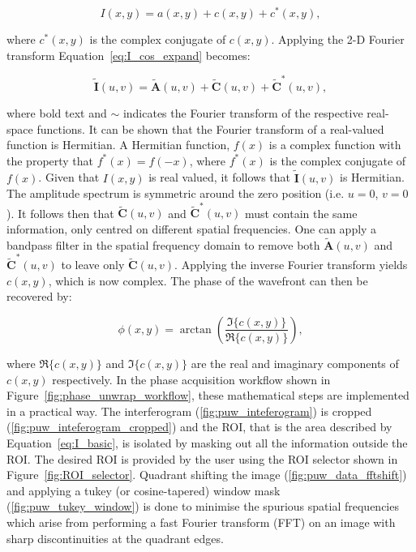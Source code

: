 \begin{equation}\label{eq:I_cos_expand}
I(x,y) = a(x,y) + c(x,y) + c^{*}(x,y),
\end{equation}

where $c^{*}(x,y)$ is the complex conjugate of $c(x,y)$. Applying the 2-D Fourier transform Equation~\ref{eq:I_cos_expand} becomes:

\begin{equation}\label{eq:I_fourier}
\tilde{\boldsymbol{I}}(u,v) = \tilde{\boldsymbol{A}}(u,v) + \tilde{\boldsymbol{C}}(u,v) + \tilde{\boldsymbol{C}}^{*}(u,v),
\end{equation}

where bold text and $\sim$ indicates the Fourier transform of the respective real-space functions. It can be shown that the Fourier transform of a real-valued function is Hermitian. A Hermitian function, $f(x)$ is a complex function with the property that $f^{*}(x) = f(-x)$, where $f^{*}(x)$ is the complex conjugate of $f(x)$. Given that $I(x,y)$ is real valued, it follows that $\tilde{\boldsymbol{I}}(u,v)$ is Hermitian. The amplitude spectrum is symmetric around the zero position (i.e. $u = 0$, $v = 0$). It follows then that $\tilde{\boldsymbol{C}}(u,v)$ and $\tilde{\boldsymbol{C}}^{*}(u,v)$ must contain the same information, only centred on different spatial frequencies. One can apply a bandpass filter in the spatial frequency domain to remove both $\tilde{\boldsymbol{A}}(u,v)$ and $\tilde{\boldsymbol{C}}^{*}(u,v)$ to leave only $\tilde{\boldsymbol{C}}(u,v)$\cite{lewis1993absolute}. Applying the inverse Fourier transform yields $c(x,y)$, which is now complex. The phase of the wavefront can then be recovered by:

\begin{equation}\label{eq:phase}
\phi(x,y) = \arctan\left(\frac{\Im\{c(x,y)\}}{\Re\{c(x,y)\}}\right),
\end{equation}

where $\Re\{c(x,y)\}$ and $\Im\{c(x,y)\}$ are the real and imaginary components of $c(x,y)$ respectively. In the phase acquisition workflow shown in Figure~\ref{fig:phase_unwrap_workflow}, these mathematical steps are implemented in a practical way. The interferogram (\ref{fig:puw_inteferogram}) is cropped (\ref{fig:puw_inteferogram_cropped}) and the ROI, that is the area described by Equation~\ref{eq:I_basic}, is isolated by masking out all the information outside the ROI. The desired ROI is provided by the user using the ROI selector shown in Figure~\ref{fig:ROI_selector}. Quadrant shifting the image (\ref{fig:puw_data_fftshift}) and applying a tukey (or cosine-tapered) window mask (\ref{fig:puw_tukey_window}) is done to minimise the spurious spatial frequencies which arise from performing a fast Fourier transform (FFT) on an image with sharp discontinuities at the quadrant edges.


